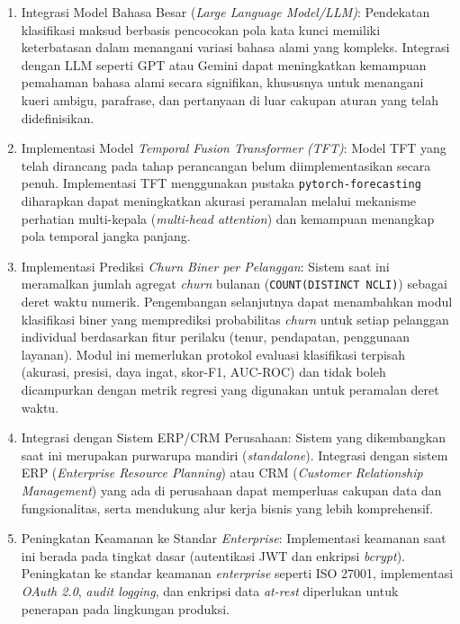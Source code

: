 \begin{enumerate}
  \item Integrasi Model Bahasa Besar (\textit{Large Language Model/LLM)}: Pendekatan klasifikasi maksud berbasis pencocokan pola kata kunci memiliki keterbatasan dalam menangani variasi bahasa alami yang kompleks. Integrasi dengan LLM seperti GPT atau Gemini dapat meningkatkan kemampuan pemahaman bahasa alami secara signifikan, khususnya untuk menangani kueri ambigu, parafrase, dan pertanyaan di luar cakupan aturan yang telah didefinisikan.

  \item Implementasi Model \textit{Temporal Fusion Transformer (TFT)}: Model TFT yang telah dirancang pada tahap perancangan belum diimplementasikan secara penuh. Implementasi TFT menggunakan pustaka \texttt{pytorch-forecasting} diharapkan dapat meningkatkan akurasi peramalan melalui mekanisme perhatian multi-kepala (\textit{multi-head attention}) dan kemampuan menangkap pola temporal jangka panjang.

  \item Implementasi Prediksi \textit{Churn Biner per Pelanggan}: Sistem saat ini meramalkan jumlah agregat \textit{churn} bulanan (\texttt{COUNT(DISTINCT NCLI)}) sebagai deret waktu numerik. Pengembangan selanjutnya dapat menambahkan modul klasifikasi biner yang memprediksi probabilitas \textit{churn} untuk setiap pelanggan individual berdasarkan fitur perilaku (tenur, pendapatan, penggunaan layanan). Modul ini memerlukan protokol evaluasi klasifikasi terpisah (akurasi, presisi, daya ingat, skor-F1, AUC-ROC) dan tidak boleh dicampurkan dengan metrik regresi yang digunakan untuk peramalan deret waktu.

  \item Integrasi dengan Sistem ERP/CRM Perusahaan: Sistem yang di\-kem\-bang\-kan saat ini merupakan purwarupa mandiri (\textit{standalone}). Integrasi dengan sistem ERP (\textit{Enterprise Resource Planning}) atau CRM (\textit{Customer Relationship Management}) yang ada di perusahaan dapat memperluas cakupan data dan fungsionalitas, serta mendukung alur kerja bisnis yang lebih komprehensif.

  \item Peningkatan Keamanan ke Standar \textit{Enterprise}: Implementasi keamanan saat ini berada pada tingkat dasar (autentikasi JWT dan enkripsi \textit{bcrypt}). Peningkatan ke standar keamanan \textit{enterprise} seperti ISO 27001, implementasi \textit{OAuth 2.0}, \textit{audit logging}, dan enkripsi data \textit{at-rest} diperlukan untuk penerapan pada lingkungan produksi.


\end{enumerate}
